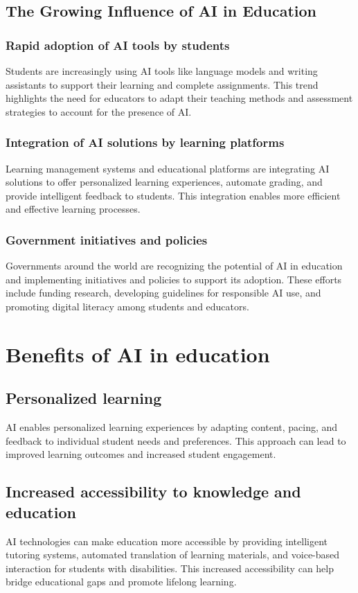 \documentclass{article}
\begin{document}
\subsection{The Growing Influence of AI in Education}

\subsubsection{Rapid adoption of AI tools by students}
Students are increasingly using AI tools like language models and writing assistants to support their learning and complete assignments. This trend highlights the need for educators to adapt their teaching methods and assessment strategies to account for the presence of AI.

\subsubsection{Integration of AI solutions by learning platforms}
Learning management systems and educational platforms are integrating AI solutions to offer personalized learning experiences, automate grading, and provide intelligent feedback to students. This integration enables more efficient and effective learning processes.

\subsubsection{Government initiatives and policies}
Governments around the world are recognizing the potential of AI in education and implementing initiatives and policies to support its adoption. These efforts include funding research, developing guidelines for responsible AI use, and promoting digital literacy among students and educators.

\section{Benefits of AI in education}

\subsection{Personalized learning}
AI enables personalized learning experiences by adapting content, pacing, and feedback to individual student needs and preferences. This approach can lead to improved learning outcomes and increased student engagement.

\subsection{Increased accessibility to knowledge and education}
AI technologies can make education more accessible by providing intelligent tutoring systems, automated translation of learning materials, and voice-based interaction for students with disabilities. This increased accessibility can help bridge educational gaps and promote lifelong learning.
\end{document}
